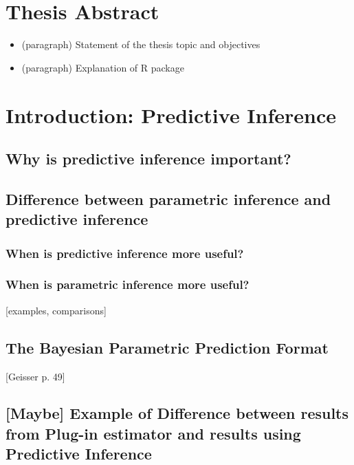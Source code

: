 \documentclass[12pt, a4paper]{article}
\begin{document}




\tableofcontents
\newpage


\section{Thesis Abstract}
  \begin{itemize}
    \item (paragraph) Statement of the thesis topic and objectives
    \item (paragraph) Explanation of R package
  \end{itemize}

\clearpage

\section{Introduction:  Predictive Inference}

  \subsection{Why is predictive inference important?}

  \subsection{Difference between parametric inference and predictive inference}

    \subsubsection{When is predictive inference more useful?}

    \subsubsection{When is parametric inference more useful?}
      [examples, comparisons]

  \subsection{The Bayesian Parametric Prediction Format}
    [Geisser p. 49]

  \subsection{[Maybe] Example of Difference between results from Plug-in estimator and results using Predictive Inference}
\end{document}
